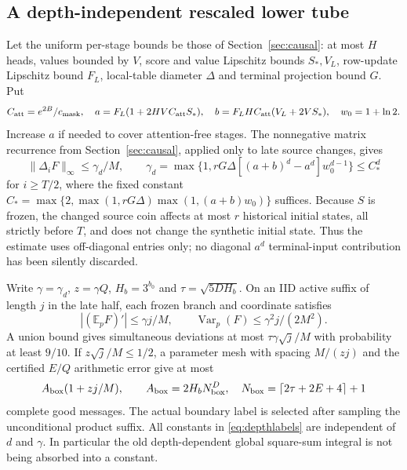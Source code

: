 \documentclass[11pt,letterpaper]{article}
\theoremstyle{definition}\newtheorem{definition}[theorem]{Definition}
\theoremstyle{remark}\newtheorem{remark}[theorem]{Remark}
\newcommand{\E}{\mathbb{E}}
\newcommand{\Var}{\operatorname{Var}}
\newcommand{\ceil}[1]{\left\lceil #1\right\rceil}
\begin{document}
\subsection{A depth-independent rescaled lower tube}
Let the uniform per-stage bounds be those of Section~\ref{sec:causal}: at most $H$ heads, values bounded by $V$, score and value Lipschitz bounds $S_*,V_L$, row-update Lipschitz bound $F_L$, local-table diameter $\Delta$ and terminal projection bound $G$. Put
\[
 C_{\rm att}=e^{2B}/c_{\rm mask},\quad
 a=F_L(1+2HVC_{\rm att}S_*),\quad
 b=F_LHC_{\rm att}(V_L+2VS_*),\quad w_0=1+\ln2.
\]
Increase $a$ if needed to cover attention-free stages. The nonnegative matrix recurrence from Section~\ref{sec:causal}, applied only to late source changes, gives
\begin{equation}\label{eq:depthgain}
 \|\Delta_iF\|_\infty\le\gamma_d/M,\qquad
 \gamma_d=\max\{1,rG\Delta[(a+b)^d-a^d]w_0^{d-1}\}\le C_*^d
\end{equation}
for $i\ge T/2$, where the fixed constant
$C_*=\max\{2,\max(1,rG\Delta)\max(1,(a+b)w_0)\}$ suffices.
Because $S$ is frozen, the changed source coin affects at most $r$ historical initial states, all strictly before $T$, and does not change the synthetic initial state. Thus the estimate uses off-diagonal entries only; no diagonal $a^d$ terminal-input contribution has been silently discarded.

Write $\gamma=\gamma_d$, $z=\gamma Q$, $H_b=3^{b_0}$ and $\tau=\sqrt{5DH_b}$. On an IID active suffix of length $j$ in the late half, each frozen branch and coordinate satisfies
\[
 |(\E_pF)'|\le\gamma j/M,\qquad
 \Var_p(F)\le\gamma^2j/(2M^2).
\]
A union bound gives simultaneous deviations at most
$\tau\gamma\sqrt j/M$ with probability at least $9/10$.
If $z\sqrt j/M\le1/2$, a parameter mesh with spacing $M/(zj)$ and the certified $E/Q$ arithmetic error give at most
\begin{equation}\label{eq:depthlabels}
 A_{\rm box}(1+zj/M),\qquad
 A_{\rm box}=2H_bN_{\rm box}^D,\quad
 N_{\rm box}=\ceil{2\tau+2E+4}+1
\end{equation}
complete good messages. The actual boundary label is selected after sampling the unconditional product suffix. All constants in \eqref{eq:depthlabels} are independent of $d$ and $\gamma$. In particular the old depth-dependent global square-sum integral is not being absorbed into a constant.
\end{document}
